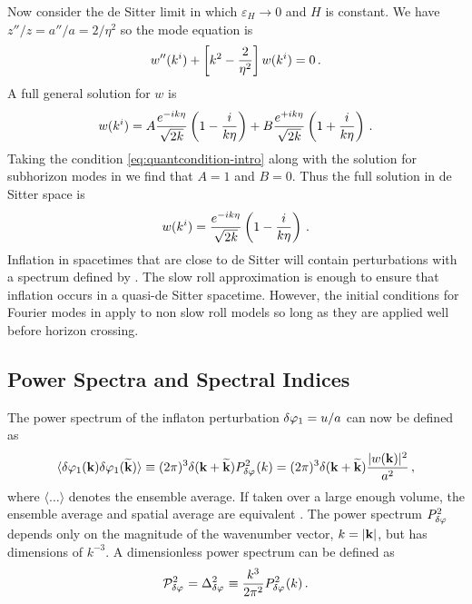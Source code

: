 Now consider the de Sitter limit in which $\varepsilon_H\rightarrow 0$ and $H$
is constant. We have $z''/z = a''/a = 2/\eta^2$ so the mode equation is
% 
\begin{equation}
  w''(k^i) + \left[ k^2 -\frac{2}{\eta^2} \right]w(k^i) = 0\,.
\end{equation}
% 
A full general solution for $w$ is
% 
\begin{equation}
 w(k^i) = A\frac{e^{-ik\eta}}{\sqrt{2k}}\left(1 -\frac{i}{k\eta}\right)
	  +B\frac{e^{+ik\eta}}{\sqrt{2k}}\left(1 +\frac{i}{k\eta}\right)\,.
\end{equation}
% 
Taking the condition \eqref{eq:quantcondition-intro} along with the solution
for subhorizon modes in  we find that $A=1$ and $B=0$.
Thus the full solution in de Sitter space is \cite{book:liddle}
% 
\begin{equation}
\label{eq:wfinal-intro}
 w(k^i) = \frac{e^{-ik\eta}}{\sqrt{2k}}\left(1 -\frac{i}{k\eta}\right)\,.
\end{equation}
% 
Inflation in spacetimes that are close to de Sitter will contain perturbations
with a spectrum defined by . The slow roll approximation is
enough to ensure that inflation occurs in a quasi-de Sitter spacetime.
However, the initial conditions for Fourier modes in 
apply to non slow roll models so long as they are applied well before horizon
crossing.


\subsection{Power Spectra and Spectral Indices}
The power spectrum of the inflaton perturbation $\delta\varphi_{1} = u/a$ can now be
defined as
% 
\begin{equation}
  \langle \delta\varphi_{1}(\textbf{k}) \delta\varphi_{1}(\widetilde{\textbf{k}}) \rangle 
   \equiv (2\pi)^3 \delta(\textbf{k} + \widetilde{\textbf{k}}) P_{\delta\varphi_{}}^2 (k)
   = (2\pi)^3 \delta(\textbf{k} + \widetilde{\textbf{k}}) \frac{|w(\textbf{k})|^2}{a^2}\,,
\end{equation}
% 
where $\langle \ldots \rangle$ denotes the ensemble average. 
If taken over a large enough volume, the ensemble average and spatial average
are equivalent \cite{book:lyth}.
The power spectrum
$P_{\delta\varphi_{}}^2$ depends only on the magnitude of the wavenumber
vector, $k=|\bf{k}|$, but has dimensions of $k^{-3}$. A dimensionless power
spectrum
can be defined as
% 
\begin{equation}
 \label{eq:curlPrdefn-intro}
 \mathcal{P}_{\delta\varphi_{}}^2= \Delta^2_{\delta\varphi_{}} \equiv \frac{k^3}{2\pi^2}
P_{\delta\varphi_{}}^2(k)\,.
\end{equation}
% 

